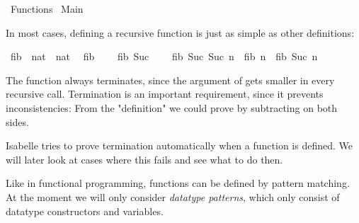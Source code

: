 %
\begin{isabellebody}%
\def\isabellecontext{Functions}%
%
\isadelimtheory
\isanewline
\isanewline
%
\endisadelimtheory
%
\isatagtheory
{}\isamarkupfalse%
\ Functions\isanewline
{}\ Main\isanewline
{}%
\endisatagtheory
{\isafoldtheory}%
%
\isadelimtheory
%
\endisadelimtheory
%
\isamarkuptrue%
%
\begin{isamarkuptext}%
\cite{isa-tutorial}%
\end{isamarkuptext}%
\isamarkuptrue%
%
\isamarkuptrue%
%
\begin{isamarkuptext}%
In most cases, defining a recursive function is just as simple as other definitions:%
\end{isamarkuptext}%
\isamarkuptrue%
\isamarkupfalse%
\ fib\ {\isacharcolon}{\isacharcolon}\ {\isachardoublequoteopen}nat\ {\isasymRightarrow}\ nat{\isachardoublequoteclose}\isanewline
{}\isanewline
\ \ {\isachardoublequoteopen}fib\ {}\ {\isacharequal}\ {}{\isachardoublequoteclose}\isanewline
{\isacharbar}\ {\isachardoublequoteopen}fib\ {\isacharparenleft}Suc\ {}{\isacharparenright}\ {\isacharequal}\ {}{\isachardoublequoteclose}\isanewline
{\isacharbar}\ {\isachardoublequoteopen}fib\ {\isacharparenleft}Suc\ {\isacharparenleft}Suc\ n{\isacharparenright}{\isacharparenright}\ {\isacharequal}\ fib\ n\ {\isacharplus}\ fib\ {\isacharparenleft}Suc\ n{\isacharparenright}{\isachardoublequoteclose}%
\begin{isamarkuptext}%
The function always terminates, since the argument of gets smaller in every
  recursive call. Termination is an
  important requirement, since it prevents inconsistencies: From
  the "definition"  we could prove 
   by subtracting  on both sides.

  Isabelle tries to prove termination automatically when a function is
  defined. We will later look at cases where this fails and see what to
  do then.%
\end{isamarkuptext}%
\isamarkuptrue%
%
\isamarkuptrue%
%
\begin{isamarkuptext}%
Like in functional programming, functions can be defined by pattern
  matching. At the moment we will only consider \emph{datatype
  patterns}, which only consist of datatype constructors and
  variables.


\end{isamarkuptext}
\end{isabellebody}

